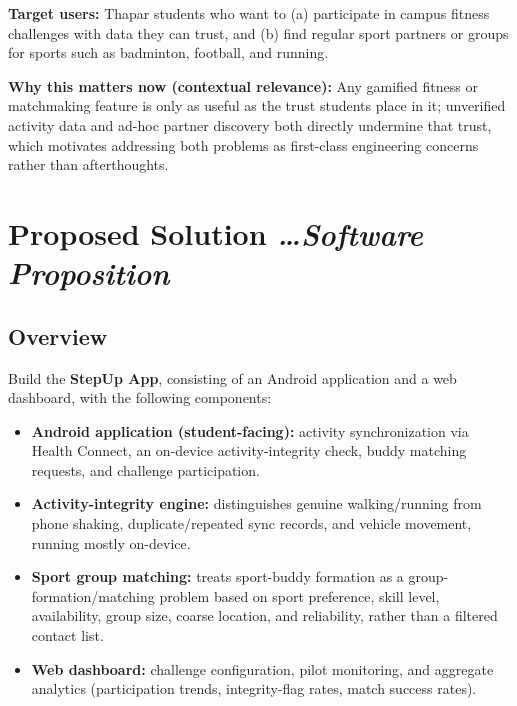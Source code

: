 \documentclass[11pt,a4paper]{article}
\newcommand{\BvrHint}[1]{%
  {\normalfont\normalsize\itshape\hfill #1}}
\begin{document}
\textbf{Target users:} Thapar students who want to (a) participate in
campus fitness challenges with data they can trust, and (b) find
regular sport partners or groups for sports such as badminton, football,
and running.

\textbf{Why this matters now (contextual relevance):} Any gamified
fitness or matchmaking feature is only as useful as the trust students
place in it; unverified activity data and ad-hoc partner discovery both
directly undermine that trust, which motivates addressing both problems
as first-class engineering concerns rather than afterthoughts.

\section{Proposed Solution %
\BvrHint{\ldots Software Proposition}}
\subsection{Overview}
Build the \textbf{StepUp App}, consisting of an Android application and
a web dashboard, with the following components:
\begin{itemize}[leftmargin=0.7cm]
    \item \textbf{Android application (student-facing):} activity synchronization via Health Connect, an on-device activity-integrity check, buddy matching requests, and challenge participation.
    \item \textbf{Activity-integrity engine:} distinguishes genuine walking/running from phone shaking, duplicate/repeated sync records, and vehicle movement, running mostly on-device.
    \item \textbf{Sport group matching:} treats sport-buddy formation as a group-formation/matching problem based on sport preference, skill level, availability, group size, coarse location, and reliability, rather than a filtered contact list.
    \item \textbf{Web dashboard:} challenge configuration, pilot monitoring, and aggregate analytics (participation trends, integrity-flag rates, match success rates).
\end{itemize}
\end{document}
